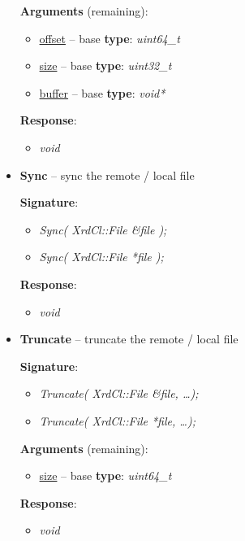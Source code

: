 \documentclass{article}
\begin{document}
\begin{itemize}
			        \textbf{Arguments} (remaining):
					\begin{itemize}
					  \item \underline{offset} -- base \textbf{type}: \textit{uint64_t}
					  \item \underline{size} -- base \textbf{type}: \textit{uint32_t}
					  \item \underline{buffer} -- base \textbf{type}: \textit{void*}
				    \end{itemize}
				    
					\textbf{Response}:
					\begin{itemize}
					  \item \textit{void}
					\end{itemize}
					
				  \item \textbf{Sync} -- sync the remote / local file
				  
				  	\textbf{Signature}:
				  	\begin{itemize} 
			          \item \textit{Sync( XrdCl::File \&file );}
			          \item \textit{Sync( XrdCl::File *file );}
			        \end{itemize}
	
					\textbf{Response}:
					\begin{itemize}
					  \item \textit{void}
					\end{itemize}
					
				  \item \textbf{Truncate} -- truncate the remote / local file
				  
				  	\textbf{Signature}:
				  	\begin{itemize} 
			          \item \textit{Truncate( XrdCl::File \&file, \ldots);}
			          \item \textit{Truncate( XrdCl::File *file, \ldots );}
			        \end{itemize}
			        
			        \textbf{Arguments} (remaining):
					\begin{itemize}
					  \item \underline{size} -- base \textbf{type}: \textit{uint64_t}
				    \end{itemize}
				    
					\textbf{Response}:
					\begin{itemize}
					  \item \textit{void}
					\end{itemize}
					

\end{itemize}
\end{document}
